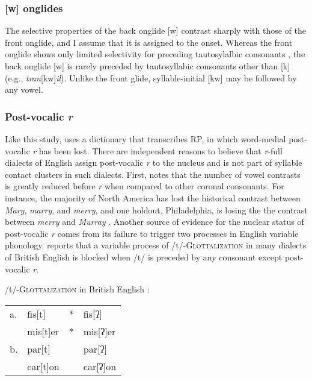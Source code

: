 
\subsubsection{[w] onglides}

The selective properties of the back onglide [w] contrast sharply with those of the front onglide, and I assume that it is assigned to the onset. Whereas the front onglide shows only limited selectivity for preceding tautosylalbic consonants \citep{Kaye1996}, the back onglide [w] is rarely preceded by tautosyllabic consonants other than [k] (e.g., \emph{tran}[kw]\emph{il}). Unlike the front glide, syllable-initial [kw] may be followed by any vowel.

\subsubsection{Post-vocalic \emph{r}}

Like this study, \citet{Pierrehumbert1994} uses a dictionary that transcribes RP, in which word-medial post-vocalic \emph{r} has been lost. There are independent reasons to believe that \emph{r}-full dialects of English assign post-vocalic \emph{r} to the nucleus and is not part of syllable contact clusters in such dialects. First, \citet[][255]{Harris1994} notes that the number of vowel contrasts is greatly reduced before \emph{r} when compared to other coronal consonants. For instance, the majority of North America has lost the historical contrast between \emph{Mary}, \emph{marry}, and \emph{merry}, and one holdout, Philadelphia, is losing the the contrast between \emph{merry} and \emph{Murray} \citep[14f.]{ANAE}. Another source of evidence for the nuclear status of post-vocalic \emph{r} comes from its failure to trigger two processes in English variable phonology. \citeauthor{Harris1994} reports that a variable process of /t/-\textsc{Glottalization} in many dialects of British English is blocked when /t/ is preceded by any consonant except post-vocalic \emph{r}.

\ex /t/-\textsc{Glottalization} in British English \citep[after][195, 258]{Harris1994}: \\
\begin{tabular}{l l l@{} l}
a. & fis[t]   & * & fis[ʔ]   \\
   & mis[t]er & * & mis[ʔ]er \\
b. & par[t]   &   & par[ʔ]   \\
   & car[t]on &   & car[ʔ]on \\
\end{tabular}
\xe

